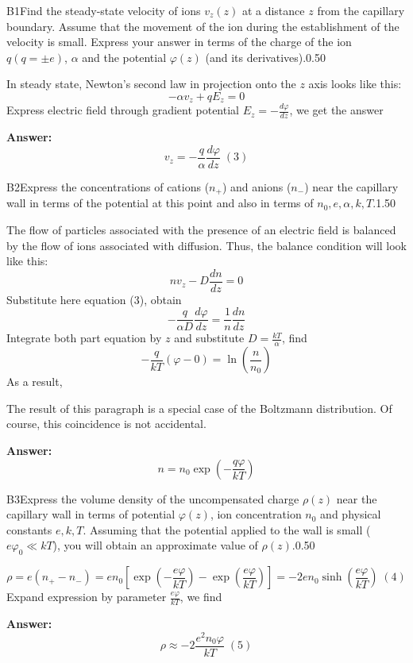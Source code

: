 \documentclass[11pt,a4paper]{article}
\begin{document}
\begin{solcard}{B1}{Find the steady-state velocity of ions $v_z(z)$ at a distance $z$ from the capillary boundary. Assume that the movement of the ion during the establishment of the velocity is small. Express your answer in terms of the charge of the ion $q(q = \pm e)$, $\alpha$ and the potential $\varphi(z)$ (and its derivatives).}{0.50}

In steady state, Newton's second law in projection onto the $z$ axis looks like this: $$ -\alpha v_z + q E_z = 0 $$ Express electric field through gradient potential $E_z = - \tfrac{d \varphi}{dz}$, we get the answer

\par\smallskip\noindent\textbf{Answer:} $$ v_z = - \frac{q}{\alpha} \frac{d \varphi}{dz} \;(\text{3}) $$
\end{solcard}

\begin{solcard}{B2}{Express the concentrations of cations ($n_+$) and anions ($n_-$) near the capillary wall in terms of the potential at this point and also in terms of $n_0, e, \alpha, k, T$.}{1.50}

The flow of particles associated with the presence of an electric field is balanced by the flow of ions associated with diffusion. Thus, the balance condition will look like this: $$ n v_z -D \frac{dn}{dz} = 0 $$ Substitute here equation (3), obtain $$ -\frac{q}{\alpha D} \frac{d \varphi}{dz} = \frac{1}{n} \frac{dn}{dz} $$ Integrate both part equation by $z$ and substitute $D=\frac{kT}{\alpha}$, find $$ -\frac{q}{kT} (\varphi - 0) = \ln(\frac{n}{n_0}) $$ As a result,


The result of this paragraph is a special case of the Boltzmann distribution. Of course, this coincidence is not accidental.

\par\smallskip\noindent\textbf{Answer:} $$ n = n_0 \exp \left( -\frac{q \varphi}{kT} \right) $$
\end{solcard}

\begin{solcard}{B3}{Express the volume density of the uncompensated charge $\rho(z)$ near the capillary wall in terms of potential $\varphi(z)$, ion concentration $n_0$ and physical constants $e, k, T$. Assuming that the potential applied to the wall is small ($e\varphi_0 \ll kT$), you will obtain an approximate value of $\rho(z)$.}{0.50}

$$ \rho = e(n_+ - n_-) = en_0 \left[ \exp \left( -\frac{e \varphi}{kT} \right)  - \exp \left( \frac{e \varphi}{kT} \right) \right] = - 2 e n_0 \sinh{\left( \frac{e \varphi}{kT} \right)} \;(\text{4}) $$ Expand expression by parameter $\frac{e \varphi}{kT}$, we find

\par\smallskip\noindent\textbf{Answer:} $$ \rho \approx - 2 \frac{e^2 n_0 \varphi}{kT} \;(\text{5}) $$
\end{solcard}
\end{document}

